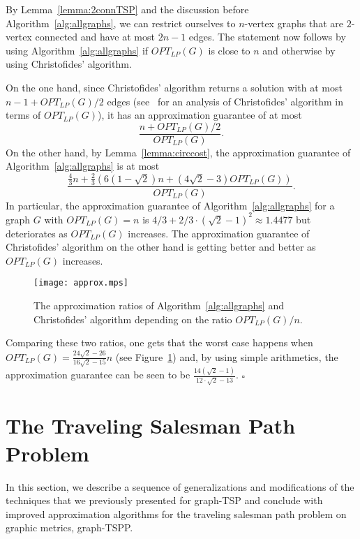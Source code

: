 \documentclass[letterpaper,11pt]{article}
\newenvironment{proof}{\begin{trivlist}
\item[\hskip\labelsep {\bf Proof}.]}{\QED \end{trivlist}}
\newcommand{\QED}{\hfill $\square$}
\newcommand{\OLP}[1]{\ensuremath{OPT_{LP}(#1)}}
\newcommand{\TSP}{graph-TSP\xspace}
\newcommand{\HPP}{graph-TSPP\xspace}
\begin{document}
\begin{proof}
  By Lemma~\ref{lemma:2connTSP} and the discussion before
  Algorithm~\ref{alg:allgraphs}, we can restrict ourselves to
  $n$-vertex graphs that are $2$-vertex connected and have at most
  $2n-1$ edges.  The statement now follows by using
  Algorithm~\ref{alg:allgraphs} if $\OLP{G}$ is close to $n$ and
  otherwise by using Christofides' algorithm. 

  On the one hand, since Christofides' algorithm returns a solution
  with at most $n-1 + \OLP{G}/2$ edges (see~\cite{SW90} for an
analysis of Christofides' algorithm in terms of \OLP{G}), it has an approximation guarantee of at
  most
$$
\frac{n + \OLP{G}/2}{\OLP{G}}.
$$
On the other hand, by Lemma~\ref{lemma:circcost}, the approximation
guarantee of Algorithm~\ref{alg:allgraphs} is at most
$$
\frac{\frac{4}{3} n + \frac{2}{3} \left( 6(1-\sqrt{2})n + (4\sqrt{2} -3)\OLP{G} \right) }{\OLP{G}}.
$$
In particular, the approximation guarantee of
Algorithm~\ref{alg:allgraphs} for a graph $G$ with $\OLP{G}=n$ is $4/3 +
2/3\cdot (\sqrt{2}-1)^2 \approx 1.4477$ but deteriorates as \OLP{G}
increases. The approximation guarantee of Christofides' algorithm on
the other hand is getting better and better as \OLP{G} increases.
\begin{figure}[tb]
    \begin{center}
        \texttt{[image: approx.mps]}
    \end{center}
    \caption{The approximation ratios of
    Algorithm~\ref{alg:allgraphs} and Christofides' algorithm depending on
    the ratio $\OLP{G}/n$.}
    \label{fig:ratios}
\end{figure}
Comparing these two ratios, one gets that the worst case happens when
$\OLP{G} = \frac{24\sqrt{2}-26}{16\sqrt{2}-15} n$ (see Figure~\ref{fig:ratios}) and, by using simple
arithmetics, the approximation guarantee can be seen to be
$\frac{14(\sqrt{2}-1)}{12\cdot \sqrt{2}-13}$.
\end{proof}

\section{The Traveling Salesman Path Problem}\label{sec:tspp}
\label{sec:tspp}
In this section, we describe a sequence of generalizations and modifications of
the techniques that we previously presented for \TSP and conclude with improved
approximation algorithms for the traveling salesman path problem on graphic
metrics, \HPP.
\end{document}
